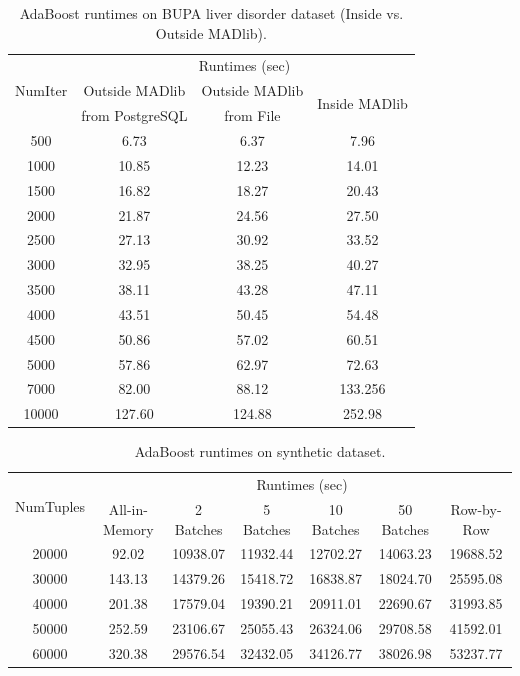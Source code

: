\begin{table}[!htbp]
\small
\centering
\begin{tabular}{|c|c|c|c|}
\hline
\multirow{3}{*}{NumIter}&\multicolumn{3}{|c|}{Runtimes (sec)}\\
\cline{2-4}
&Outside MADlib&Outside MADlib&\multirow{2}{*}{Inside MADlib}\\
&from PostgreSQL&from File&\\
\hline
500&6.73 &6.37 &7.96 \\
\hline
1000&10.85 &12.23 &14.01 \\\hline
1500&16.82 &18.27 &20.43 \\\hline
2000&21.87 &24.56 &27.50 \\\hline
2500&27.13 &30.92 &33.52 \\\hline
3000&32.95 &38.25 &40.27 \\\hline
3500&38.11 &43.28 &47.11 \\\hline
4000&43.51 &50.45 &54.48 \\\hline
4500&50.86 &57.02 &60.51 \\\hline
5000&57.86 &62.97 &72.63 \\\hline
7000&82.00 &88.12 &133.256 \\\hline
10000&127.60 &124.88 &252.98 \\
\hline
\end{tabular}
\caption{AdaBoost runtimes on BUPA liver disorder dataset (Inside vs. Outside MADlib).}
\label{tab:adaBupa2}
\end{table}

\begin{table}[!htbp]
\small
\centering
\begin{tabular}{|c|c|c|c|c|c|c|}
\hline
\multirow{2}{*}{NumTuples} & \multicolumn{6}{|c|}{Runtimes (sec)}\\
\cline{2-7}
& All-in-Memory & 2 Batches & 5 Batches & 10 Batches & 50 Batches & Row-by-Row\\
\hline
20000&92.02 &10938.07 &11932.44 &12702.27 &14063.23 &19688.52 \\
\hline
30000&143.13 &14379.26 &15418.72 &16838.87 &18024.70 &25595.08 \\
\hline
40000&201.38 &17579.04 &19390.21 &20911.01 &22690.67 &31993.85 \\
\hline
50000&252.59 &23106.67 &25055.43 &26324.06 &29708.58 &41592.01 \\
\hline
60000&320.38 &29576.54 &32432.05 &34126.77 &38026.98 &53237.77 \\
\hline
\end{tabular}
\caption{AdaBoost runtimes on synthetic dataset.}
\label{tab:adaSynth1}
\end{table}

